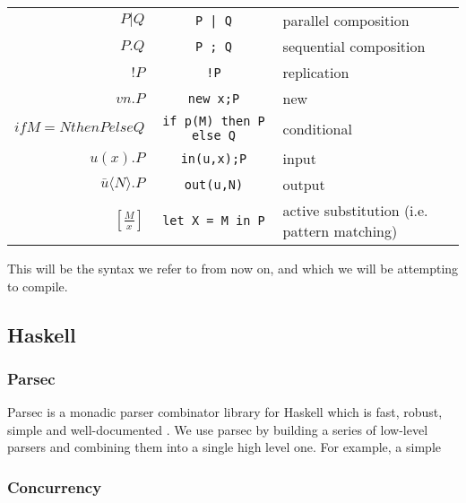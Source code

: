 \begin{table}[hc!]
    \begin{tabular}{r c l}
        $P|Q$& \verb!P | Q!& parallel composition\\
        $P.Q$& \verb!P ; Q!& sequential composition\\
        $!P$ & \verb?!P?& replication \\
        $vn.P$& \verb!new x;P!& new \\
        $if M=N then P else Q $&\verb!if p(M) then P else Q!& conditional \\
        $u(x).P$&\verb!in(u,x);P!& input \\
        $\bar{u}\langle N \rangle .P$&\verb!out(u,N)!& output \\
        $\left[ \frac{M}{x} \right]$&\verb!let X = M in P!&  active substitution (i.e. pattern matching) \\
    \end{tabular}
\end{table} 

This will be the syntax we refer to from now on, and which we will be attempting to compile.

\subsection{Haskell}



\subsubsection{Parsec}

Parsec is a monadic parser combinator library for Haskell which is fast, robust, simple and well-documented \cite{lm01}. We use parsec by building a series of low-level parsers and combining them into a single high level one.
For example, a simple 


\subsubsection{Concurrency}
